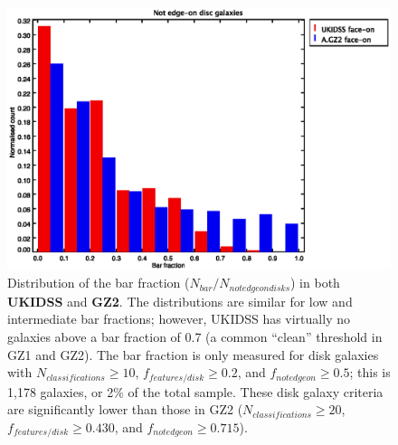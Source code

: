 \documentclass[useAMS,usenatbib]{mn2e}
\begin{document}
\begin{figure}
\includegraphics[scale=1.0]{figures/bar_fraction_histogram.eps}
\caption{
    Distribution of the bar fraction ($N_{bar}/N_{not edgeon disks}$) in both {\bf\color{red}UKIDSS} and {\bf\color{blue}GZ2}. The distributions are similar for low and intermediate bar fractions; however, UKIDSS has virtually no galaxies above a bar fraction of 0.7 (a common ``clean'' threshold in GZ1 and GZ2). The bar fraction is only measured for disk galaxies with $N_{classifications} \geq 10$, $f_{features/disk} \geq 0.2$, and $f_{not edgeon}\geq0.5$; this is 1,178 galaxies, or 2\% of the total sample. These disk galaxy criteria are significantly lower than those in GZ2 ($N_{classifications} \geq 20$, $f_{features/disk} \geq 0.430$, and $f_{not edgeon}\geq0.715$). 
}
\label{fig:bar_fraction_histogram}
\end{figure}
\end{document}
